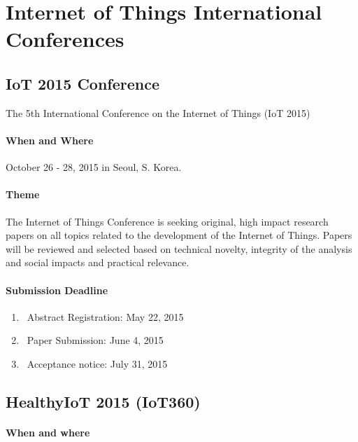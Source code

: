 \documentclass[12pt]{article}
\begin{document}
\maketitle



\section{Internet of Things International Conferences}


\subsection {IoT 2015 Conference}
The 5th International Conference on the Internet of Things (IoT 2015) 


\paragraph{When and Where} October 26 - 28, 2015 in Seoul, S. Korea.

 \paragraph{Theme}The Internet of Things Conference is seeking original, high impact research papers on all topics related to the development of the Internet of Things. Papers will be reviewed and selected based on technical novelty, integrity of the analysis and social impacts and practical relevance.

\paragraph{Submission Deadline}
\begin{enumerate}
\item\ Abstract Registration: May 22, 2015
\item\ Paper Submission: June 4, 2015
\item\ Acceptance notice: July 31, 2015

\end{enumerate}

\subsection {HealthyIoT 2015 (IoT360) }
\paragraph {When and where}
\end{document}
